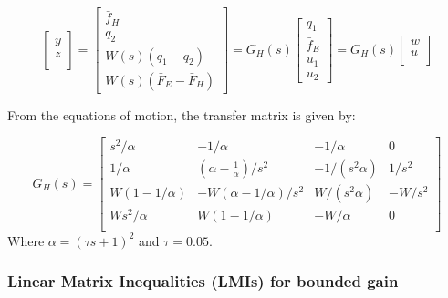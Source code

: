 \documentclass{article}
\begin{document}
\begin{equation}
    \begin{bmatrix}
        y \\
        z \\
    \end{bmatrix} = \begin{bmatrix}
        \bar{f}_H \\
        q_2 \\
        W(s)(q_1 - q_2) \\
        W(s)(\bar{F}_E - \bar{F}_H)
    \end{bmatrix} = G_H(s) \begin{bmatrix}
        q_1 \\
        \bar{f}_E \\
        u_1 \\
        u_2
    \end{bmatrix} = G_H(s) \begin{bmatrix}
        w \\
        u \\
    \end{bmatrix}
\end{equation}

From the equations of motion, the transfer matrix is given by:

\begin{equation}
    G_H(s) = \begin{bmatrix}
        s^2/\alpha & -1/\alpha & -1/\alpha & 0 \\
        1/\alpha & \left(\alpha - \frac{1}{\alpha}\right)/s^2 & - 1/(s^2 \alpha) & 1/s^2 \\
        W\left(1 - 1/\alpha \right) & - W\left( \alpha- 1/\alpha \right)/s^2 & W / (s^2 \alpha) & - W/s^2 \\
        W s^2 / \alpha & W(1 - 1/\alpha) & - W/\alpha & 0 \\
    \end{bmatrix}
\end{equation}
Where $\alpha = (\tau s + 1)^2$ and $\tau = 0.05$.

\subsubsection{Linear Matrix Inequalities (LMIs) for bounded gain}
\end{document}
